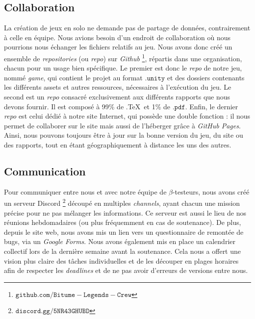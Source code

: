 \documentclass[12pt,a4paper]{article}
\begin{document}
        \subsection{Collaboration}
            La création de jeux en solo ne demande pas de partage de données, contrairement 
            à celle en équipe. Nous avions besoin d'un endroit de collaboration où nous 
            pourrions nous échanger les fichiers relatifs au jeu. 
            Nous avons donc créé un ensemble de \textit{repositories} (ou \textit{repo}) sur \textsl{Github}
            \footnote{\(\mathtt{github.com/Bitume-Legends-Crew}\)}, répartis dans une organisation,
            chacun pour un usage bien spécifique. Le premier est donc le \textit{repo} de
            notre jeu, nommé \textit{game}, qui contient le projet au format \(\mathtt{.unity}\)
            et des dossiers contenants les différents assets et autres ressources,
            nécessaires à l'exécution du jeu. 
            Le second est un \textit{repo} consacré exclusivement aux différents rapports 
            que nous devons fournir. Il est composé à 99\% de .\TeX\, et 1\% de \(\mathtt{.pdf}\).
            Enfin, le dernier \textit{repo} est celui dédié à notre site Internet, qui
            possède une double fonction : il nous permet de collaborer sur le site
            mais aussi de l'héberger grâce à \textsl{GitHub Pages}.\\
            \indent Ainsi, nous pouvons toujours être à jour sur la bonne version du jeu,
            du site ou des rapports, tout en étant géographiquement à distance les uns 
            des autres.
    
        \subsection{Communication}
            Pour communiquer entre nous et avec notre équipe de \(\beta\)-testeurs, nous
            avons créé un serveur Discord \footnote{\(\mathtt{discord.gg/5NR43GHUBD}\)}
            découpé en multiples 
            \textit{channels}, ayant chacun une mission précise pour ne pas mélanger les
            informations. Ce serveur est aussi le lieu de nos réunions hebdomadaires 
            (ou plus fréquemment en cas de soutenance). De plus, depuis le site web, nous
            avons mis un lien vers un questionnaire de remontée de bugs, via un \textsl{Google Forms}.
            Nous avons également mis en place un calendrier collectif lors de la
            dernière semaine avant la soutenance. Cela nous a offert une vision plus
            claire des tâches individuelles et de les découper en plages horaires afin de 
            respecter les \textit{deadlines} et de ne pas avoir d'erreurs de versions
            entre nous.
    
\end{document}
